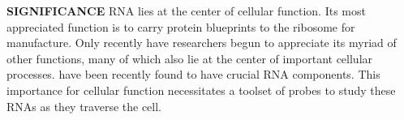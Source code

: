 

\textbf{SIGNIFICANCE}
RNA lies at the center of cellular function. Its most appreciated function is to carry protein blueprints to the ribosome for manufacture. Only recently have researchers begun to appreciate its myriad of other functions, many of which also lie at the center of important cellular processes.\cite{CechNoncodingRNARevolution2014}  have been recently found to have crucial RNA components.
This importance for cellular function necessitates a toolset of probes to study these RNAs as they traverse the cell.

